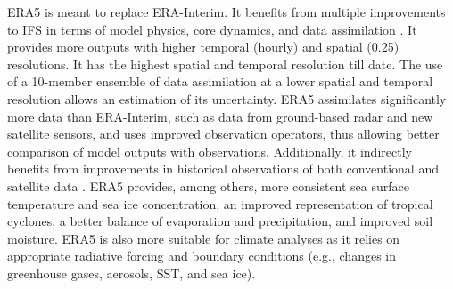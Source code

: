 \documentclass[alpha-refs]{wiley-article}
\begin{document}
ERA5 \citep{Hersbach2019} is meant to replace ERA-Interim. It benefits from multiple improvements to IFS in terms of model physics, core dynamics, and data assimilation \citep{Hersbach2019}. It provides more outputs with higher temporal (hourly) and spatial (0.25\degree) resolutions. It has the highest spatial and temporal resolution till date. The use of a 10-member ensemble of data assimilation at a lower spatial and temporal resolution allows an estimation of its uncertainty. ERA5 assimilates significantly more data than ERA-Interim, such as data from ground-based radar and new satellite sensors, and uses improved observation operators, thus allowing better comparison of model outputs with observations. Additionally, it indirectly benefits from improvements in historical observations of both conventional and satellite data \citep{Hersbach2019}. ERA5 provides, among others, more consistent sea surface temperature and sea ice concentration, an improved representation of tropical cyclones, a better balance of evaporation and precipitation, and improved soil moisture. ERA5 is also more suitable for climate analyses as it relies on appropriate radiative forcing and boundary conditions (e.g., changes in greenhouse gases, aerosols, SST, and sea ice).
\end{document}
